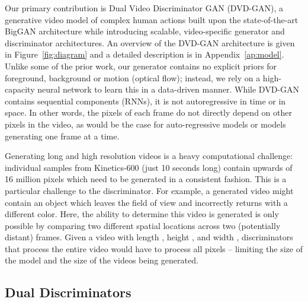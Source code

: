 \documentclass{article} \usepackage{iclr2020_conference,times}
\begin{document}
Our primary contribution is Dual Video Discriminator GAN (DVD-GAN), a generative video model of complex human actions built upon the state-of-the-art BigGAN architecture \citep{brock2018large} while introducing scalable, video-specific generator and discriminator architectures. An overview of the DVD-GAN architecture is given in Figure~\ref{fig:diagram} and a detailed description is in Appendix~\ref{ap:model}. Unlike some of the prior work, our generator contains no explicit priors for foreground, background or motion (optical flow); instead, we rely on a high-capacity neural network to learn this in a data-driven manner. While DVD-GAN contains sequential components (RNNs), it is not autoregressive in time or in space. In other words, the pixels of each frame do not directly depend on other pixels in the video, as would be the case for auto-regressive models or models generating one frame at a time.

Generating long and high resolution videos is a heavy computational challenge: individual samples from Kinetics-600 (just 10 seconds long) contain upwards of 16 million pixels which need to be generated in a consistent fashion. This is a particular challenge to the discriminator. For example, a generated video might contain an object which leaves the field of view and incorrectly returns with a different color. Here, the ability to determine this video is generated is only possible by comparing two different spatial locations across two (potentially distant) frames. Given a video with length , height , and width , discriminators that process the entire video 
would have to process all  pixels -- limiting the size of the model and the size of the videos being generated. 

\subsection{Dual Discriminators}
\label{ss:dd}
\end{document}
